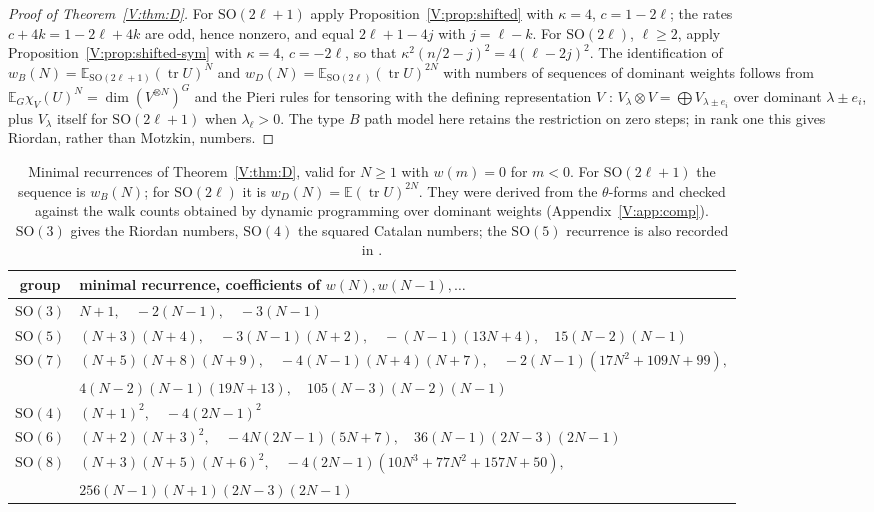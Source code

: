 \documentclass[11pt,a4paper]{article}
\theoremstyle{definition}
\theoremstyle{remark}
\newcommand{\E}{\mathbb E}
\DeclareMathOperator{\tr}{tr}
\numberwithin{equation}{section}
\begin{document}
\begin{proof}[Proof of Theorem~\ref{V:thm:D}]
For $\mathrm{SO}(2\ell+1)$ apply Proposition~\ref{V:prop:shifted} with $\kappa=4$, $c=1-2\ell$; the rates $c+4k=1-2\ell+4k$ are odd, hence nonzero, and equal $2\ell+1-4j$ with $j=\ell-k$. For $\mathrm{SO}(2\ell)$, $\ell\ge2$, apply Proposition~\ref{V:prop:shifted-sym} with $\kappa=4$, $c=-2\ell$, so that $\kappa^2(n/2-j)^2=4(\ell-2j)^2$. The identification of $w_B(N)=\E_{\mathrm{SO}(2\ell+1)}(\tr U)^N$ and $w_D(N)=\E_{\mathrm{SO}(2\ell)}(\tr U)^{2N}$ with numbers of sequences of dominant weights follows from $\E_G\chi_V(U)^N=\dim(V^{\otimes N})^G$ and the Pieri rules for tensoring with the defining representation $V$ \cite{GM93}: $V_\lambda\otimes V=\bigoplus V_{\lambda\pm e_i}$ over dominant $\lambda\pm e_i$, plus $V_\lambda$ itself for $\mathrm{SO}(2\ell+1)$ when $\lambda_\ell>0$. The type $B$ path model here retains the restriction on zero steps; in rank one this gives Riordan, rather than Motzkin, numbers.
\end{proof}

\begin{table}[ht]
\centering
\small
\renewcommand{\arraystretch}{1.25}
\begin{tabular}{@{}cl@{}}
\toprule
group & minimal recurrence, coefficients of $w(N),w(N-1),\dots$\\
\midrule
$\mathrm{SO}(3)$ & $N+1,\quad-2(N-1),\quad-3(N-1)$\\
$\mathrm{SO}(5)$ & $(N+3)(N+4),\quad-3(N-1)(N+2),\quad-(N-1)(13N+4),\quad15(N-2)(N-1)$\\
$\mathrm{SO}(7)$ & $(N+5)(N+8)(N+9),\quad-4(N-1)(N+4)(N+7),\quad-2(N-1)(17N^2+109N+99),$\\
& $4(N-2)(N-1)(19N+13),\quad105(N-3)(N-2)(N-1)$\\
\midrule
$\mathrm{SO}(4)$ & $(N+1)^2,\quad-4(2N-1)^2$\\
$\mathrm{SO}(6)$ & $(N+2)(N+3)^2,\quad-4N(2N-1)(5N+7),\quad36(N-1)(2N-3)(2N-1)$\\
$\mathrm{SO}(8)$ & $(N+3)(N+5)(N+6)^2,\quad-4(2N-1)(10N^3+77N^2+157N+50),$\\
& $256(N-1)(N+1)(2N-3)(2N-1)$\\
\bottomrule
\end{tabular}
\medskip
\caption{Minimal recurrences of Theorem~\ref{V:thm:D}, valid for $N\ge1$ with $w(m)=0$ for $m<0$. For $\mathrm{SO}(2\ell+1)$ the sequence is $w_B(N)$; for $\mathrm{SO}(2\ell)$ it is $w_D(N)=\E(\tr U)^{2N}$. They were derived from the $\theta$-forms and checked against the walk counts obtained by dynamic programming over dominant weights (Appendix~\ref{V:app:comp}). $\mathrm{SO}(3)$ gives the Riordan numbers, $\mathrm{SO}(4)$ the squared Catalan numbers; the $\mathrm{SO}(5)$ recurrence is also recorded in \cite[A095922]{OEIS}.}\label{V:tab:walks}
\end{table}
\end{document}
